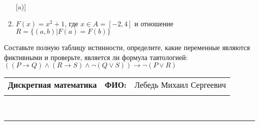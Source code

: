 \documentclass[10pt]{exam}
\newcommand{\class}{Дискретная математика}
\newcommand{\examdate}{}
\begin{document}
\begin{questions}
\begin{enumerate} [a)]
\item $F(x)=x^{2}+1$, где $x \in A = [-2, 4]$ и отношение $R = \{(a,b)|F(a) = F(b)\}$
\end{enumerate}\question Составьте полную таблицу истинности, определите, какие переменные являются фиктивными и проверьте, является ли формула тавтологией:
$((P \rightarrow Q) \land (R \rightarrow S) \land \neg (Q \lor S)) \rightarrow \neg (P \lor R)$

\end{questions}
\newpage
\begin{flushright}
\begin{tabular}{p{2.8in} r l}
\textbf{\class} & \textbf{ФИО:} &Лебедь Михаил Сергеевич
\\

\textbf{\examdate} &&\\
\end{tabular}\\
\end{flushright}
\rule[1ex]{\textwidth}{.1pt}
\end{document}
